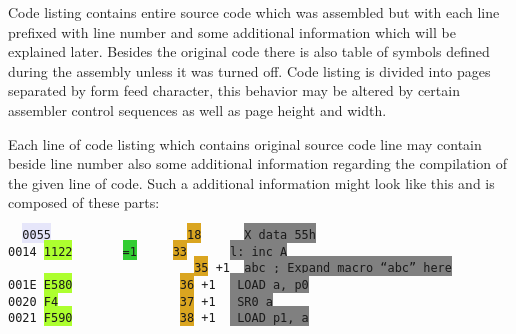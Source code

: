                 Code listing contains entire source code which was assembled but with each line prefixed with line number and some additional information which will be explained later. Besides the original code there is also table of symbols defined during the assembly unless it was turned off. Code listing is divided into pages separated by form feed character, this behavior may be altered by certain assembler control sequences as well as page height and width.

                Each line of code listing which contains original source code line may contain beside line number also some additional information regarding the compilation of the given line of code. Such a additional information might look like this and is composed of these parts:

                \begin{code}[h]
                        \verb'  '\texttt{\colorbox{Lavender}{0055}}\verb'                   '\texttt{\colorbox{Goldenrod}{18}}\verb'      '\texttt{\colorbox{Gray}{X      data     55h}} \\
                        \texttt{\colorbox{Apricot}{0014}}\verb' '\texttt{\colorbox{GreenYellow}{1122}}\verb'       '\texttt{\colorbox{LimeGreen}{=1}}\verb'     '\texttt{\colorbox{Goldenrod}{33}}\verb'      '\texttt{\colorbox{Gray}{l:     inc      A}} \\
                        \verb'                          '\texttt{\colorbox{Goldenrod}{35}}\verb' '\texttt{\colorbox{ProcessBlue}{+1}}\verb'  '\texttt{\colorbox{Gray}{abc     ; Expand macro ``abc'' here}} \\
                        \texttt{\colorbox{Apricot}{001E}}\verb' '\texttt{\colorbox{GreenYellow}{E580}}\verb'               '\texttt{\colorbox{Goldenrod}{36}}\verb' '\texttt{\colorbox{ProcessBlue}{+1}}\verb'  '\texttt{\colorbox{Gray}{                LOAD     a, p0}} \\
                        \texttt{\colorbox{Apricot}{0020}}\verb' '\texttt{\colorbox{GreenYellow}{F4}}\verb'                 '\texttt{\colorbox{Goldenrod}{37}}\verb' '\texttt{\colorbox{ProcessBlue}{+1}}\verb'  '\texttt{\colorbox{Gray}{                SR0     a}} \\
                        \texttt{\colorbox{Apricot}{0021}}\verb' '\texttt{\colorbox{GreenYellow}{F590}}\verb'               '\texttt{\colorbox{Goldenrod}{38}}\verb' '\texttt{\colorbox{ProcessBlue}{+1}}\verb'  '\texttt{\colorbox{Gray}{                LOAD     p1, a}} \\\\

\end{code}
